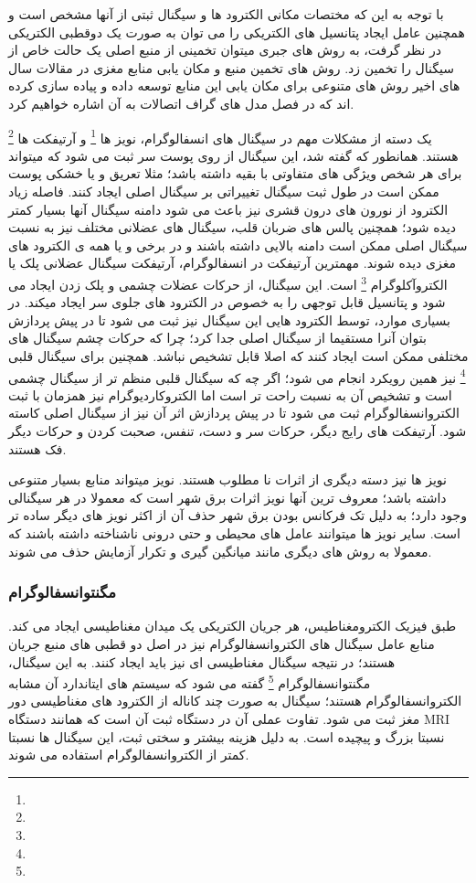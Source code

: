 \documentclass[11pt]{extarticle}
\begin{document}
با توجه به این که مختصات مکانی الکترود ها و سیگنال ثبتی از آنها مشخص است و همچنین عامل ایجاد پتانسیل های الکتریکی را می توان به صورت یک دوقطبی الکتریکی در نظر گرفت، به روش های جبری میتوان تخمینی از منبع اصلی یک حالت خاص از سیگنال را تخمین زد. روش های تخمین منبع و مکان یابی منابع مغزی در مقالات سال های اخیر روش های متنوعی برای مکان یابی این منابع توسعه داده و پیاده سازی کرده اند که در فصل مدل های گراف اتصالات به آن اشاره خواهیم کرد.

یک دسته از مشکلات مهم در سیگنال های انسفالوگرام، نویز ها
\footnote{}
 و آرتیفکت ها 
\footnote{}
 هستند. همانطور که گفته شد، این سیگنال از روی پوست سر ثبت می شود که میتواند برای هر شخص ویژگی های متفاوتی با بقیه داشته باشد؛ مثلا تعریق و یا خشکی پوست ممکن است در طول ثبت سیگنال تغییراتی بر سیگنال اصلی ایجاد کنند. فاصله زیاد الکترود از نورون های  درون قشری نیز باعث می شود دامنه سیگنال آنها بسیار کمتر دیده شود؛ همچنین پالس های ضربان قلب، سیگنال های عضلانی مختلف نیز به نسبت سیگنال اصلی ممکن است دامنه بالایی داشته باشند و در برخی و یا همه ی الکترود های مغزی دیده شوند. مهمترین آرتیفکت در انسفالوگرام، آرتیفکت سیگنال عضلانی پلک یا الکتروآکلوگرام
\footnote{}
 است. این سیگنال، از حرکات عضلات چشمی و پلک زدن ایجاد می شود و پتانسیل قابل توجهی را به خصوص در الکترود های جلوی سر ایجاد میکند. در بسیاری موارد، توسط الکترود هایی این سیگنال نیز ثبت می شود تا در پیش پردازش بتوان آنرا مستقیما از سیگنال اصلی جدا کرد؛ چرا که حرکات چشم سیگنال های مختلفی ممکن است ایجاد کنند که اصلا قابل تشخیص نباشد. همچنین برای سیگنال قلبی
\footnote{}
 نیز همین رویکرد انجام می شود؛ اگر چه که سیگنال قلبی منظم تر از سیگنال چشمی است و تشخیص آن به نسبت راحت تر است اما الکتروکاردیوگرام نیز همزمان با ثبت الکتروانسفالوگرام ثبت می شود تا در پیش پردازش اثر آن نیز از سیگنال اصلی کاسته شود. آرتیفکت های رایج دیگر، حرکات سر و دست، تنفس، صحبت کردن و حرکات دیگر فک هستند.
 
 نویز ها نیز دسته دیگری از اثرات نا مطلوب هستند. نویز میتواند منابع بسیار متنوعی داشته باشد؛ معروف ترین آنها نویز اثرات برق شهر است که معمولا در هر سیگنالی وجود دارد؛ به دلیل تک فرکانس بودن برق شهر حذف آن از اکثر نویز های دیگر ساده تر است. سایر نویز ها میتوانند عامل های محیطی و حتی درونی ناشناخته داشته باشند که معمولا به روش های دیگری مانند میانگین گیری و تکرار آزمایش حذف می شوند.

\subsubsection{مگنتوانسفالوگرام}
طبق فیزیک الکترومغناطیس، هر جریان الکتریکی یک میدان مغناطیسی ایجاد می کند. منابع عامل سیگنال های الکتروانسفالوگرام نیز در اصل دو قطبی های منبع جریان هستند؛ در نتیجه سیگنال مغناطیسی ای نیز باید ایجاد کنند. به این سیگنال، مگنتوانسفالوگرام 
\footnote{}
گفته می شود که سیستم های ایتاندارد آن مشابه الکتروانسفالوگرام هستند؛ سیگنال به صورت چند کاناله از الکترود های مغناطیسی دور مغز ثبت می شود. تفاوت عملی آن در دستگاه ثبت آن است که همانند دستگاه 
MRI
 نسبتا بزرگ و پیچیده است. به دلیل هزینه بیشتر و سختی ثبت، این سیگنال ها نسبتا کمتر از الکتروانسفالوگرام استفاده می شوند.
 
\end{document}
